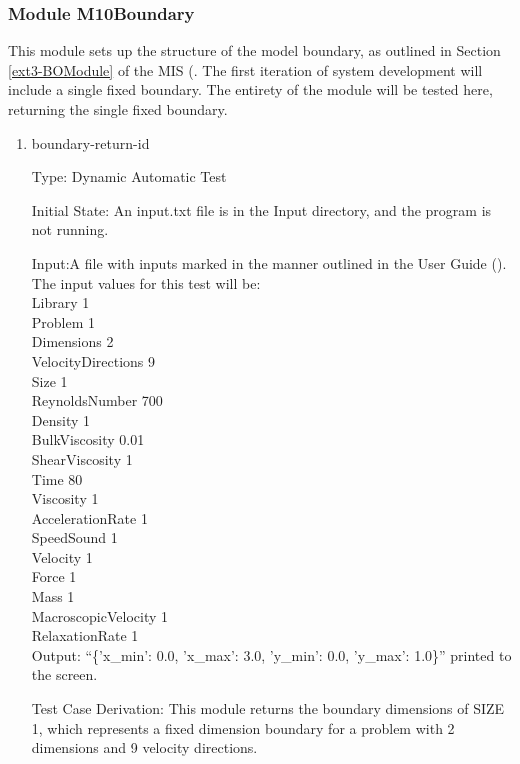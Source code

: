 \documentclass[12pt, titlepage]{article}
\newcounter{uvtestcounter} %
\begin{document}
\subsubsection{Module M10Boundary}
\label{M10Boundary}

This module sets up the structure of the model boundary, as outlined in Section \ref{ext3-BOModule} of the MIS (\citet{LBM_MIS_PM}. The first iteration of system development will include a single fixed boundary. The entirety of the module will be tested here, returning the single fixed boundary.

\begin{enumerate}
	
	\item{boundary-return-id\theuvtestcounter\\}
	
	Type: Dynamic Automatic Test
	
Initial State: An input.txt file is in the Input directory, and the program is not running.

Input:A file with inputs marked in the manner outlined in the
User Guide (\citet{LBM_UserGuide_PM}).\\The input values for this test will
be:\\

Library 1\\
Problem 1\\
Dimensions 2\\
VelocityDirections 9\\
Size 1\\
ReynoldsNumber 700\\
Density 1\\
BulkViscosity 0.01\\
ShearViscosity 1\\
Time 80\\
Viscosity 1\\
AccelerationRate 1\\
SpeedSound 1\\
Velocity 1\\
Force 1\\
Mass 1\\
MacroscopicVelocity 1\\
RelaxationRate 1\\
	
	Output: ``\{'x\_min': 0.0, 'x\_max': 3.0, 'y\_min': 0.0, 'y\_max': 1.0\}'' printed to the screen.
	
	Test Case Derivation: This module returns the boundary dimensions of SIZE 1, which represents a fixed dimension boundary for a problem with 2 dimensions and 9 velocity directions.
	

\end{enumerate}
\end{document}
